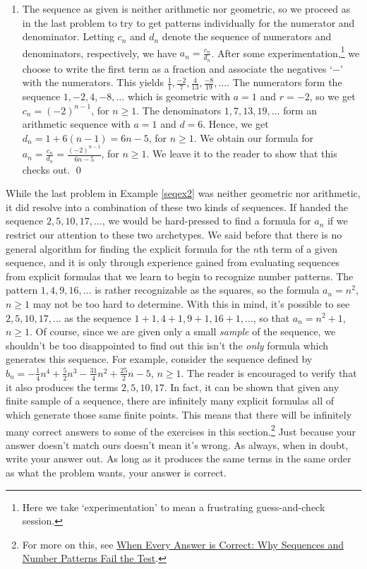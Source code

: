 \begin{ex}
\begin{enumerate}
\item  The sequence as given is neither arithmetic nor geometric, so we proceed as in the last problem to try to get patterns individually for the numerator and denominator.  Letting $c_{n}$ and $d_{n}$ denote the sequence of numerators and denominators, respectively, we have $a_{n} = \frac{c_{n}}{d_{n}}$.  After some experimentation,\footnote{Here we take `experimentation' to mean a frustrating guess-and-check session.} we choose to write the first term as a fraction and associate the negatives `$-$' with the numerators.  This yields $\frac{1}{1}, \frac{-2}{7}, \frac{4}{13}, \frac{-8}{19}, \ldots$.  The numerators form the sequence $1, -2, 4, -8, \ldots$ which is geometric with $a=1$ and $r = -2$, so we get $c_{n} = (-2)^{n-1}$, for $n \geq 1$.  The denominators $1, 7, 13, 19, \ldots$ form an arithmetic sequence with $a = 1$ and $d = 6$.  Hence, we get $d_{n} = 1 + 6(n-1) = 6n-5$, for $n \geq 1$.  We obtain our formula for $a_{n} = \frac{c_{n}}{d_{n}} = \frac{(-2)^{n-1}}{6n-5}$, for $n \geq 1$.  We leave it to the reader to show that this checks out. \qed

\end{enumerate}

\end{ex}

While the last problem in Example \ref{seqex2} was neither geometric nor arithmetic, it did resolve into a combination of these two kinds of sequences.  If handed the sequence $2, 5, 10, 17, \ldots$, we would be hard-pressed to find a formula for $a_{n}$ if we restrict our attention to these two archetypes.  We said before that there is no general algorithm for finding the explicit formula for the $n$th term of a given sequence, and it is only through experience gained from evaluating sequences from explicit formulas that we learn to begin to recognize number patterns.  The pattern $1, 4, 9, 16, \ldots$ is rather recognizable as the squares, so the formula $a_{n} = n^2$, $n \geq 1$ may not be too hard to determine.  With this in mind, it's possible to see  $2, 5, 10, 17, \ldots$ as the sequence $1 + 1, 4 + 1, 9 + 1, 16 + 1 , \ldots$, so that $a_{n} = n^2 + 1$, $n \geq 1$.  Of course, since we are given only a small \textit{sample} of the sequence, we shouldn't be too disappointed to find out this isn't the \textit{only} formula which generates this sequence.  For example, consider the sequence defined by $b_{n} = -\frac{1}{4} n^4 + \frac{5}{2} n^3 - \frac{31}{4} n^2 + \frac{25}{2} n - 5$, $n \geq 1$.  The reader is encouraged to verify that it also produces the  terms  $2, 5, 10, 17$.  In fact, it can be shown that given any finite sample of a sequence, there are infinitely many explicit formulas all of which generate those same finite points.  This means that there will be infinitely many correct answers to some of the exercises in this section.\footnote{For more on this, see \href{http://www.math.kent.edu/~white/papers/pattern.pdf}{\underline{When Every Answer is Correct: Why
Sequences and Number Patterns Fail the Test}}.}  Just because your answer doesn't match ours doesn't mean it's wrong.  As always, when in doubt, write your answer out.  As long as it produces the same terms in the same order as what the problem wants, your answer is correct.  

